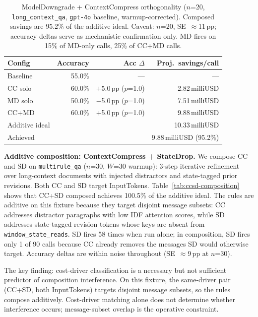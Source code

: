 \begin{table}[t]
\caption{ModelDowngrade + ContextCompress orthogonality ($n$=20,
\texttt{long\_context\_qa}, \texttt{gpt-4o} baseline, warmup-corrected).
Composed savings are 95.2\% of the additive ideal. Caveat: $n$=20,
SE~$\approx$11\,pp; accuracy deltas serve as mechanistic confirmation only.
MD fires on 15\% of MD-only calls, 25\% of CC+MD calls.}
\label{tab:mdcc-orthogonality}
\small
\begin{tabular}{lrrr}
\toprule
Config & Accuracy & Acc $\Delta$ & Proj.\ savings/call \\
\midrule
Baseline  & 55.0\% & --- & --- \\
CC solo   & 60.0\% & $+$5.0\,pp ($p$=1.0) & 2.82\,milliUSD \\
MD solo   & 50.0\% & $-$5.0\,pp ($p$=1.0) & 7.51\,milliUSD \\
CC+MD     & 60.0\% & $+$5.0\,pp ($p$=1.0) & 9.88\,milliUSD \\
\midrule
Additive ideal & & & 10.33\,milliUSD \\
Achieved & & & 9.88\,milliUSD (95.2\%) \\
\bottomrule
\end{tabular}
\end{table}

\textbf{Additive composition: ContextCompress + StateDrop.} We compose CC and SD on
\texttt{multirule\_qa} ($n$=30, $W$=30 warmup): 3-step iterative refinement over
long-context documents with injected distractors and state-tagged prior revisions.
Both CC and SD target InputTokens. Table~\ref{tab:ccsd-composition} shows that CC+SD
composed achieves 100.5\% of the additive ideal. The rules are additive on this
fixture because they target disjoint message subsets: CC addresses distractor
paragraphs with low IDF attention scores, while SD addresses state-tagged revision
tokens whose keys are absent from \texttt{window\_state\_reads}. SD fires 58 times
when run alone; in composition, SD fires only 1 of 90 calls because CC already
removes the messages SD would otherwise target. Accuracy deltas are within noise
throughout (SE~$\approx$9\,pp at $n$=30).

The key finding: cost-driver classification is a necessary but not sufficient
predictor of composition interference. On this fixture, the same-driver pair
(CC+SD, both InputTokens) targets disjoint message subsets, so the rules compose
additively. Cost-driver matching alone does not determine whether interference occurs;
message-subset overlap is the operative constraint.


